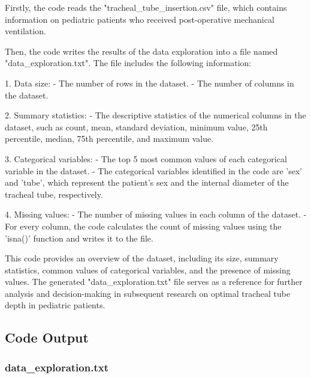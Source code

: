 \documentclass[11pt]{article}
\begin{document}
Firstly, the code reads the "tracheal\_tube\_insertion.csv" file, which contains information on pediatric patients who received post-operative mechanical ventilation. 

Then, the code writes the results of the data exploration into a file named "data\_exploration.txt". The file includes the following information:

1. Data size:
   - The number of rows in the dataset.
   - The number of columns in the dataset.

2. Summary statistics:
   - The descriptive statistics of the numerical columns in the dataset, such as count, mean, standard deviation, minimum value, 25th percentile, median, 75th percentile, and maximum value.

3. Categorical variables:
   - The top 5 most common values of each categorical variable in the dataset.
   - The categorical variables identified in the code are 'sex' and 'tube', which represent the patient's sex and the internal diameter of the tracheal tube, respectively.

4. Missing values:
   - The number of missing values in each column of the dataset.
   - For every column, the code calculates the count of missing values using the 'isna()' function and writes it to the file.

This code provides an overview of the dataset, including its size, summary statistics, common values of categorical variables, and the presence of missing values. The generated "data\_exploration.txt" file serves as a reference for further analysis and decision-making in subsequent research on optimal tracheal tube depth in pediatric patients.

\subsection{Code Output}

\subsubsection*{data\_exploration.txt}
\end{document}
